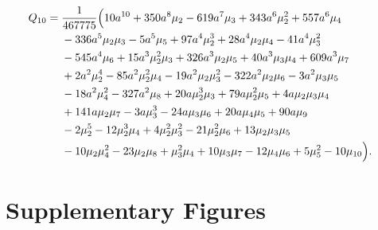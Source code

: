 \documentclass[9pt,twocolumn,twoside]{gsajnl}
\begin{document}
\vspace*{-0.4cm}
\begin{equation*}
\hspace*{-0.38cm}
\begin{aligned}
Q_{10}={}&\frac1{467775}\Bigl(
10a^{10}+350a^8\mu_2-619a^7\mu_3+343a^6\mu_2^2+557a^6\mu_4
\notag\\
&-336a^5\mu_2\mu_3-5a^5\mu_5+97a^4\mu_2^3+28a^4\mu_2\mu_4-41a^4\mu_3^2
\notag\\
&-545a^4\mu_6+15a^3\mu_2^2\mu_3+326a^3\mu_2\mu_5+40a^3\mu_3\mu_4+609a^3\mu_7
\notag\\
&+2a^2\mu_2^4-85a^2\mu_2^2\mu_4-19a^2\mu_2\mu_3^2-322a^2\mu_2\mu_6-3a^2\mu_3\mu_5
\notag\\
&-18a^2\mu_4^2-327a^2\mu_8+20a\mu_2^3\mu_3+79a\mu_2^2\mu_5+4a\mu_2\mu_3\mu_4
\notag\\
&+141a\mu_2\mu_7-3a\mu_3^3-24a\mu_3\mu_6+20a\mu_4\mu_5+90a\mu_9
\notag\\
&-2\mu_2^5-12\mu_2^3\mu_4+4\mu_2^2\mu_3^2-21\mu_2^2\mu_6+13\mu_2\mu_3\mu_5
\notag\\
&-10\mu_2\mu_4^2-23\mu_2\mu_8+\mu_3^2\mu_4+10\mu_3\mu_7-12\mu_4\mu_6+5\mu_5^2-10\mu_{10}
\Bigr).
\end{aligned}
\end{equation*}



%
%




\renewcommand{\thefigure}{S\arabic{figure}}
\setcounter{figure}{0}

\renewcommand{\thetable}{S\arabic{table}}
\setcounter{table}{0}

\newpage
\section{Supplementary Figures}
\end{document}
